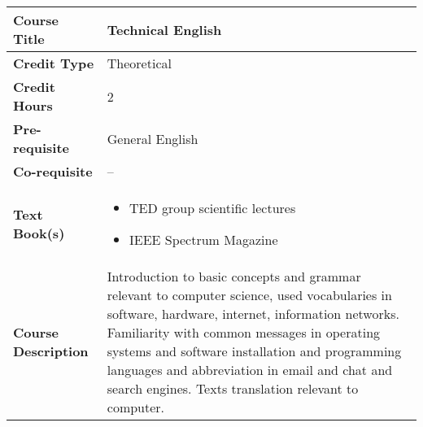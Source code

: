 \documentclass[11pt]{article}
\begin{document}
\begin{table}[h!]
\begin{tabular}{|l|l|}
\hline
\textbf{Course Title}       &   Technical English\\ \hline
\textbf{Credit Type}        &   Theoretical \\ \hline
\textbf{Credit Hours}       &  2 \\ \hline
\textbf{Pre-requisite}       &  General English \\ \hline
\textbf{Co-requisite}       &  -- \\ \hline
\textbf{Text Book(s)}       & \begin{minipage}{.70\textwidth}
\begin{itemize} \itemsep-0.4em
	\vspace{3mm}
	\item TED group scientific lectures
	\item IEEE Spectrum Magazine
	\vspace{3mm}
\end{itemize}
\end{minipage}\\ \hline
\textbf{Course Description} & \begin{minipage}{.70\textwidth}
\vspace{3mm}
Introduction to basic concepts and grammar relevant to computer science, used vocabularies in
software, hardware, internet, information networks.
Familiarity with common messages in operating systems and software installation and programming
languages and abbreviation in email and chat and search engines.
Texts translation relevant to computer.
\vspace{3mm}
\end{minipage} \\ \hline
\end{tabular}
\end{table}
\end{document}
